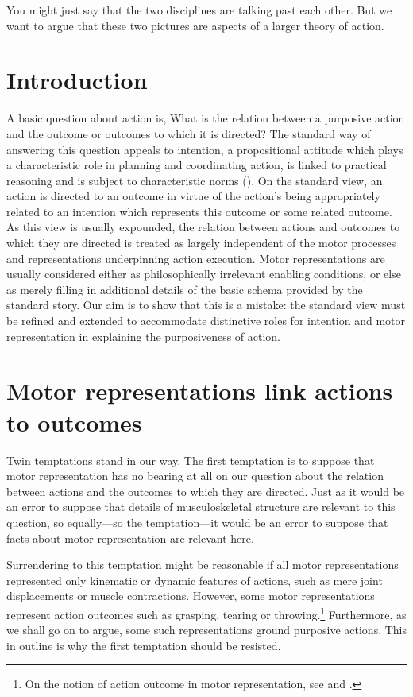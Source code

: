 \documentclass[12pt,\papersize]{extarticle}
\begin{document}
You might just say that the two disciplines are talking past each other.
But we want to argue that these two pictures are aspects of a larger theory of action.


\section{Introduction}

A basic question about action is,
What is the relation between a purposive action and the outcome or outcomes to which it is directed? The standard way of answering this question appeals to intention, a propositional attitude which plays a characteristic role in planning and coordinating action, is linked to practical reasoning and is subject to characteristic norms (\citealp{Bratman:1987xw}).  On the standard view, an action is directed to an outcome in virtue of the action's being appropriately related to an intention which represents this outcome or some related outcome. As this view is usually expounded, the relation between actions and outcomes to which they are directed is treated as largely independent of the motor processes and representations underpinning action execution. Motor representations are usually considered either as philosophically irrelevant enabling conditions, or else as merely filling in additional details of the basic schema provided by the standard story. Our aim is to show that this is a mistake:
the standard view must be  refined and extended  to accommodate distinctive roles for intention and motor representation in explaining the purposiveness of action.




\section{Motor representations link actions to outcomes}

Twin temptations stand in our way.
The first  temptation is to suppose that motor representation has no bearing at all on our question about the relation between actions and the outcomes to which they are directed. Just as it would be an error to suppose that details of musculoskeletal structure are relevant to this question, so equally---so the temptation---it would be an error to suppose that facts about motor representation are relevant here. 

Surrendering to this temptation might be reasonable if all motor representations represented only kinematic or dynamic features of actions, such as mere joint displacements or muscle contractions. However, 
 some motor representations represent action outcomes such as grasping, tearing or throwing.\footnote{ On the notion of action outcome in motor representation, see \citet{jeannerod_motor_2006} and \citet{rizzolatti_mirrors_2008}.}
 Furthermore, as we shall go on to argue, some such representations ground purposive actions. This in outline is why the first temptation should be resisted.
\end{document}
